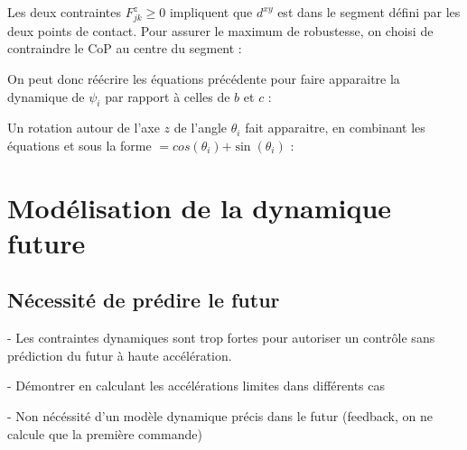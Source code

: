 			Les deux contraintes $ F^z_{jk} \ge 0$ impliquent que $d^{xy}$ est dans le segment défini par les deux points de contact. 
			Pour assurer le maximum de robustesse, on choisi de contraindre le CoP au centre du segment :
			
			On peut donc réécrire les équations précédente pour faire apparaitre la dynamique de $\psi_i$ par rapport à celles de $b$ et $c$ :
			
			Un rotation autour de l'axe $z$ de l'angle $\theta_i$ fait apparaitre, en combinant les équations  et  sous la forme  $=cos(\theta_i)$$+\sin(\theta_i)$ :
	\section{Modélisation de la dynamique future}
		\subsection{Nécessité de prédire le futur}

			- Les contraintes dynamiques sont trop fortes pour autoriser un contrôle sans prédiction du futur à haute accélération.

			- Démontrer en calculant les accélérations limites dans différents cas

			- Non nécéssité d'un modèle dynamique précis dans le futur (feedback, on ne calcule que la première commande)

